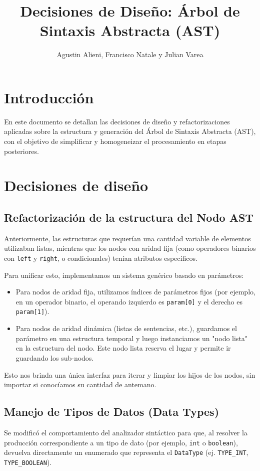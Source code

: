 \documentclass[11pt,a4paper]{article}
\title{Decisiones de Diseño: Árbol de Sintaxis Abstracta (AST)}
\author{Agustin Alieni, Francisco Natale y Julian Varea}
\date{}
\begin{document}
\maketitle

\section{Introducción}
En este documento se detallan las decisiones de diseño y refactorizaciones aplicadas sobre la estructura y generación del Árbol de Sintaxis Abstracta (AST), con el objetivo de simplificar y homogeneizar el procesamiento en etapas posteriores.

\section{Decisiones de diseño}

\subsection{Refactorización de la estructura del Nodo AST}
Anteriormente, las estructuras que requerían una cantidad variable de elementos utilizaban listas, mientras que los nodos con aridad fija (como operadores binarios con \texttt{left} y \texttt{right}, o condicionales) tenían atributos específicos.

Para unificar esto, implementamos un sistema genérico basado en parámetros:
\begin{itemize}
    \item Para nodos de aridad fija, utilizamos índices de parámetros fijos (por ejemplo, en un operador binario, el operando izquierdo es \texttt{param[0]} y el derecho es \texttt{param[1]}).
    \item Para nodos de aridad dinámica (listas de sentencias, etc.), guardamos el parámetro en una estructura temporal y luego instanciamos un "nodo lista" en la estructura del nodo. Este nodo lista reserva el lugar y permite ir guardando los sub-nodos.
\end{itemize}
Esto nos brinda una única interfaz para iterar y limpiar los hijos de los nodos, sin importar si conocíamos su cantidad de antemano.

\subsection{Manejo de Tipos de Datos (Data Types)}
Se modificó el comportamiento del analizador sintáctico para que, al resolver la producción correspondiente a un tipo de dato (por ejemplo, \texttt{int} o \texttt{boolean}), devuelva directamente un enumerado que representa el \texttt{DataType} (ej. \texttt{TYPE\_INT}, \texttt{TYPE\_BOOLEAN}).
\end{document}
